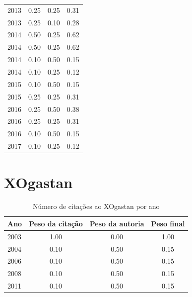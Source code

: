 \begin{table}[H]
\begin{tabular}{| l | c | c | c |}
  2013
    & 0.25
    & 0.25
    & {\color{red} 0.31} \\
  2013
    & 0.25
    & 0.10
    & {\color{red} 0.28} \\
\hline
  2014
    & 0.50
    & 0.25
    & {\color{blue} 0.62} \\
  2014
    & 0.50
    & 0.25
    & {\color{blue} 0.62} \\
  2014
    & 0.10
    & 0.50
    & {\color{red} 0.15} \\
  2014
    & 0.10
    & 0.25
    & {\color{red} 0.12} \\
\hline
  2015
    & 0.10
    & 0.50
    & {\color{red} 0.15} \\
  2015
    & 0.25
    & 0.25
    & {\color{red} 0.31} \\
\hline
  2016
    & 0.25
    & 0.50
    & {\color{red} 0.38} \\
  2016
    & 0.25
    & 0.25
    & {\color{red} 0.31} \\
  2016
    & 0.10
    & 0.50
    & {\color{red} 0.15} \\
\hline
  2017
    & 0.10
    & 0.25
    & {\color{red} 0.12} \\
\hline
\end{tabular}
\end{table}
\section{XOgastan}
\begin{table}[H]
\caption{Número de citações ao XOgastan por ano}
\centering
\begin{tabular}{| l | c | c | c |}
  \hline
  Ano & Peso da citação & Peso da autoria & Peso final \\
  \hline
  2003
    & 1.00
    & 0.00
    & {\color{blue} 1.00} \\
\hline
  2004
    & 0.10
    & 0.50
    & {\color{red} 0.15} \\
\hline
  2006
    & 0.10
    & 0.50
    & {\color{red} 0.15} \\
\hline
  2008
    & 0.10
    & 0.50
    & {\color{red} 0.15} \\
\hline
  2011
    & 0.10
    & 0.50
    & {\color{red} 0.15} \\
\hline
\end{tabular}
\end{table}

